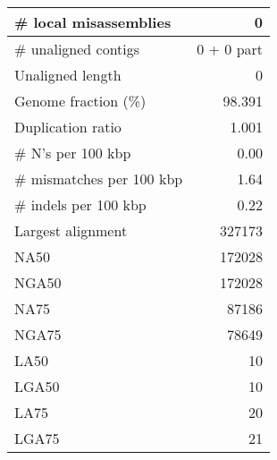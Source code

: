 \documentclass[12pt,a4paper]{article}
\begin{document}
\begin{table}[ht]
\begin{center}
\begin{tabular}{|l*{1}{|r}|}
\# local misassemblies & 0 \\ \hline
\# unaligned contigs & 0 + 0 part \\ \hline
Unaligned length & 0 \\ \hline
Genome fraction (\%) & 98.391 \\ \hline
Duplication ratio & 1.001 \\ \hline
\# N's per 100 kbp & 0.00 \\ \hline
\# mismatches per 100 kbp & 1.64 \\ \hline
\# indels per 100 kbp & 0.22 \\ \hline
Largest alignment & 327173 \\ \hline
NA50 & 172028 \\ \hline
NGA50 & 172028 \\ \hline
NA75 & 87186 \\ \hline
NGA75 & 78649 \\ \hline
LA50 & 10 \\ \hline
LGA50 & 10 \\ \hline
LA75 & 20 \\ \hline
LGA75 & 21 \\ \hline
\end{tabular}
\end{center}
\end{table}
\end{document}
